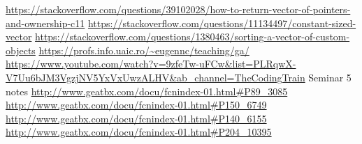 \documentclass[12pt,leqno]{article}
\begin{document}
\newpage

\begin{thebibliography}{9}
  \bibitem{}
    \url{https://stackoverflow.com/questions/39102028/how-to-return-vector-of-pointers-and-ownership-c11}
  \bibitem{}
    \url{https://stackoverflow.com/questions/11134497/constant-sized-vector}
  \bibitem{}
    \url{https://stackoverflow.com/questions/1380463/sorting-a-vector-of-custom-objects}  
  \bibitem{}
    \url{https://profs.info.uaic.ro/~eugennc/teaching/ga/}  
  \bibitem{}
    \url{https://www.youtube.com/watch?v=9zfeTw-uFCw&list=PLRqwX-V7Uu6bJM3VgzjNV5YxVxUwzALHV&ab_channel=TheCodingTrain}  
  \bibitem{}
    Seminar 5 notes
  \bibitem{}
    \url{http://www.geatbx.com/docu/fcnindex-01.html#P89_3085}
  \bibitem{}
    \url{http://www.geatbx.com/docu/fcnindex-01.html#P150_6749}
  \bibitem{}
    \url{http://www.geatbx.com/docu/fcnindex-01.html#P140_6155}
  \bibitem{}
    \url{http://www.geatbx.com/docu/fcnindex-01.html#P204_10395}

  \end{thebibliography}  
  
\end{document}

